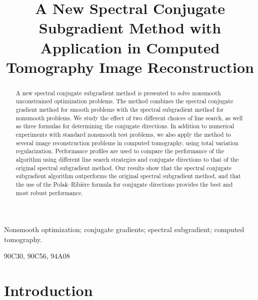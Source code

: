 \documentclass[]{interact}
\newcommand{\Real}{\mathbb{R}}
\theoremstyle{plain}%
\theoremstyle{definition}
\theoremstyle{remark}
\begin{document}

\title{A New Spectral Conjugate Subgradient Method with Application in Computed Tomography Image Reconstruction}

\author{
}


\maketitle

\begin{abstract}
A new spectral conjugate subgradient method is presented to solve nonsmooth unconstrained optimization problems. The method combines the spectral conjugate gradient method for smooth problems with the spectral subgradient method for nonsmooth problems. We study the effect of two different choices of line search, as well as three formulas for determining the conjugate directions. In addition to numerical experiments with standard nonsmooth test problems, we also apply the method to several image reconstruction problems in computed tomography, using total variation regularization. Performance profiles are used to compare the performance of the algorithm using different line search strategies and conjugate directions to that of the original spectral subgradient method. Our results show that the spectral conjugate subgradient algorithm outperforms the original spectral subgradient method, and that the use of the Polak–Ribi\`ere formula for conjugate directions provides the best and most robust performance.
\end{abstract}

\begin{keywords}
Nonsmooth optimization; conjugate gradients; spectral subgradient; computed tomography.
\end{keywords}

\begin{amscode}90C30, 90C56, 94A08\end{amscode}

\section{Introduction}
\end{document}
